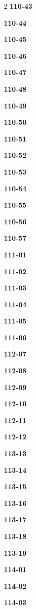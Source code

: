 \documentclass[10pt,a4paper]{article}
\begin{document}
\begin{multicols}{2}
\noindent\textbf{110-43}\ \par
\noindent\textbf{110-44}\ \par
\noindent\textbf{110-45}\ \par
\noindent\textbf{110-46}\ \par
\noindent\textbf{110-47}\ \par
\noindent\textbf{110-48}\ \par
\noindent\textbf{110-49}\ \par
\noindent\textbf{110-50}\ \par
\noindent\textbf{110-51}\ \par
\noindent\textbf{110-52}\ \par
\noindent\textbf{110-53}\ \par
\noindent\textbf{110-54}\ \par
\noindent\textbf{110-55}\ \par
\noindent\textbf{110-56}\ \par
\noindent\textbf{110-57}\ \par
\noindent\textbf{111-01}\ \par
\noindent\textbf{111-02}\ \par
\noindent\textbf{111-03}\ \par
\noindent\textbf{111-04}\ \par
\noindent\textbf{111-05}\ \par
\noindent\textbf{111-06}\ \par
\noindent\textbf{112-07}\ \par
\noindent\textbf{112-08}\ \par
\noindent\textbf{112-09}\ \par
\noindent\textbf{112-10}\ \par
\noindent\textbf{112-11}\ \par
\noindent\textbf{112-12}\ \par
\noindent\textbf{113-13}\ \par
\noindent\textbf{113-14}\ \par
\noindent\textbf{113-15}\ \par
\noindent\textbf{113-16}\ \par
\noindent\textbf{113-17}\ \par
\noindent\textbf{113-18}\ \par
\noindent\textbf{113-19}\ \par
\noindent\textbf{114-01}\ \par
\noindent\textbf{114-02}\ \par
\noindent\textbf{114-03}\ \par

\end{multicols}
\end{document}
